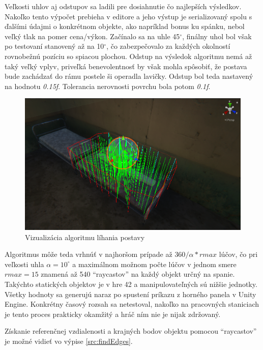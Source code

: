\documentclass[slovak, bachelorpractice]{diploma}
\begin{document}
Veľkosti uhlov aj odstupov sa ladili pre dosiahnutie čo najlepších výsledkov. Nakoľko tento výpočet prebieha v editore a jeho výstup je serializovaný spolu s ďalšími údajmi o konkrétnom objekte, ako napríklad bonus ku spánku, nebol veľký tlak na pomer cena/výkon. Začínalo sa na uhle 45$^{\circ}$, finálny uhol bol však po testovaní stanovený až na 10$^{\circ}$, čo zabezpečovalo za každých okolností rovnobežnú pozíciu so spiacou plochou. Odstup na výsledok algoritmu nemá až taký veľký vplyv, priveľká benevolentnosť by však mohla spôsobiť, že postava bude zachádzať do rámu postele ši operadla lavičky. Odstup bol teda nastavený na hodnotu \textit{0.15f}. Tolerancia nerovnosti povrchu bola potom \textit{0.1f}. 

\begin{figure}[!htbp]
	\centering
	\includegraphics[width=1\textwidth]{Pictures/algviz.png}
	\caption{Vizualizácia algoritmu líhania postavy}
	\label{pic:algviz}
\end{figure}

Algoritmus môže teda vrhnúť v najhoršom prípade až $360/\alpha * rmax$ lúčov, čo pri veľkosti uhla $\alpha = 10^{\circ}$ a maximálnom možnom počte lúčov v jednom smere $rmax = 15$ znamená až 540 \enquote{raycastov} na každý objekt určný na spanie. Takýchto statických objektov je v hre 42 a manipulovateľných sú nižšie jednotky. Všetky hodnoty sa generujú naraz po spustení príkazu z horného panela v Unity Engine. Konkrétny časový rozsah sa netestoval, nakoľko na pracovných staniciach je tento proces prakticky okamžitý a hráč ním nie je nijak zdržovaný.

Získanie referenčnej vzdialenosti a krajných bodov objektu pomocou \enquote{raycastov} je možné vidieť vo výpise \ref{src:findEdges}.
\end{document}
